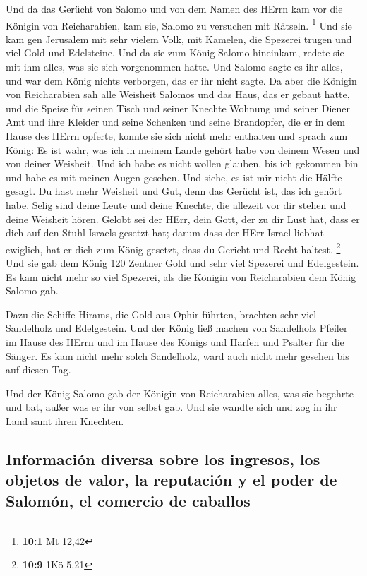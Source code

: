 Und da das Gerücht von Salomo und von dem Namen des HErrn
kam vor die Königin von Reicharabien, kam sie, Salomo zu versuchen mit
Rätseln. \footnote{\textbf{10:1} Mt 12,42}  Und sie kam
gen Jerusalem mit sehr vielem Volk, mit Kamelen, die Spezerei trugen und
viel Gold und Edelsteine. Und da sie zum König Salomo hineinkam, redete
sie mit ihm alles, was sie sich vorgenommen hatte.  Und
Salomo sagte es ihr alles, und war dem König nichts verborgen, das er
ihr nicht sagte.  Da aber die Königin von Reicharabien sah
alle Weisheit Salomos und das Haus, das er gebaut hatte, 
und die Speise für seinen Tisch und seiner Knechte Wohnung und seiner
Diener Amt und ihre Kleider und seine Schenken und seine Brandopfer, die
er in dem Hause des HErrn opferte, konnte sie sich nicht mehr enthalten
 und sprach zum König: Es ist wahr, was ich in meinem
Lande gehört habe von deinem Wesen und von deiner Weisheit.
 Und ich habe es nicht wollen glauben, bis ich gekommen
bin und habe es mit meinen Augen gesehen. Und siehe, es ist mir nicht
die Hälfte gesagt. Du hast mehr Weisheit und Gut, denn das Gerücht ist,
das ich gehört habe.  Selig sind deine Leute und deine
Knechte, die allezeit vor dir stehen und deine Weisheit hören.
 Gelobt sei der HErr, dein Gott, der zu dir Lust hat, dass
er dich auf den Stuhl Israels gesetzt hat; darum dass der HErr Israel
liebhat ewiglich, hat er dich zum König gesetzt, dass du Gericht und
Recht haltest. \footnote{\textbf{10:9} 1Kö 5,21}  Und sie
gab dem König 120 Zentner Gold und sehr viel Spezerei und Edelgestein.
Es kam nicht mehr so viel Spezerei, als die Königin von Reicharabien dem
König Salomo gab.

 Dazu die Schiffe Hirams, die Gold aus Ophir führten,
brachten sehr viel Sandelholz und Edelgestein.  Und der
König ließ machen von Sandelholz Pfeiler im Hause des HErrn und im Hause
des Königs und Harfen und Psalter für die Sänger. Es kam nicht mehr
solch Sandelholz, ward auch nicht mehr gesehen bis auf diesen Tag.

 Und der König Salomo gab der Königin von Reicharabien
alles, was sie begehrte und bat, außer was er ihr von selbst gab. Und
sie wandte sich und zog in ihr Land samt ihren Knechten.

\hypertarget{informaciuxf3n-diversa-sobre-los-ingresos-los-objetos-de-valor-la-reputaciuxf3n-y-el-poder-de-salomuxf3n-el-comercio-de-caballos}{%
\subsection{Información diversa sobre los ingresos, los objetos de
valor, la reputación y el poder de Salomón, el comercio de
caballos}\label{informaciuxf3n-diversa-sobre-los-ingresos-los-objetos-de-valor-la-reputaciuxf3n-y-el-poder-de-salomuxf3n-el-comercio-de-caballos}}

